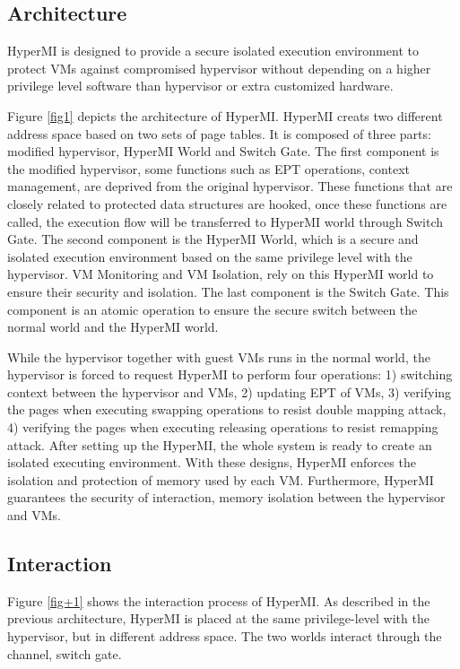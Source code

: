 \documentclass[conference]{IEEEtran}
\begin{document}
\subsection{Architecture} 
HyperMI is designed to provide a secure isolated execution environment to protect VMs against compromised hypervisor without depending on a higher privilege level software than hypervisor or extra customized hardware.

Figure \ref{fig1} depicts the architecture of HyperMI. HyperMI creats two different address space based on two sets of page tables. It is composed of three parts: modified hypervisor, HyperMI World and Switch Gate. The first component is the modified hypervisor, some functions such as EPT operations, context management, are deprived from the original hypervisor. These functions that are closely related to protected data structures are hooked, once these functions are called, the execution flow will be transferred to HyperMI world through Switch Gate. The second component is the HyperMI World, which is a secure and isolated execution environment based on the same privilege level with the hypervisor. VM Monitoring and VM Isolation, rely on this HyperMI world to ensure their security and isolation. The last component is the Switch Gate. This component is an atomic operation to ensure the secure switch between the normal world and the HyperMI world. 

While the hypervisor together with guest VMs runs in the normal world, the hypervisor is forced to request HyperMI to perform four operations: 1) switching context between the hypervisor and VMs, 2) updating EPT of VMs, 3) verifying the pages when executing swapping operations to resist double mapping attack, 4) verifying the pages when executing releasing operations to resist remapping attack. After setting up the HyperMI, the whole system is ready to create an isolated executing environment. With these designs, HyperMI enforces the isolation and protection of memory used by each VM. Furthermore, HyperMI guarantees the security of interaction, memory isolation between the hypervisor and VMs.


\iffalse
\subsection{Interaction} \label{IN}


Figure \ref{fig+1} shows the interaction process of HyperMI. 
As described in the previous architecture, HyperMI is placed at the same privilege-level with the hypervisor, but in different address space. The two worlds interact through the channel, switch gate.
\end{document}
